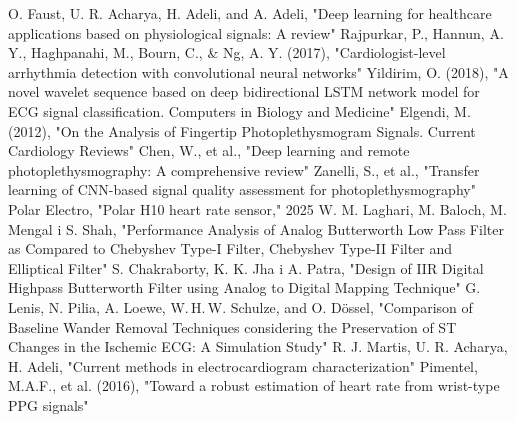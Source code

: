 \documentclass[journal]{IEEEtran}
\begin{document}
 
\newpage
\begin{thebibliography}{1}
 O. Faust, U. R. Acharya, H. Adeli, and A. Adeli, "Deep learning for healthcare applications based on physiological signals: A review"
 Rajpurkar, P., Hannun, A. Y., Haghpanahi, M., Bourn, C., \& Ng, A. Y. (2017), "Cardiologist-level arrhythmia detection with convolutional neural networks"
 Yildirim, O. (2018), "A novel wavelet sequence based on deep bidirectional LSTM network model for ECG signal classification. Computers in Biology and Medicine"
 Elgendi, M. (2012), "On the Analysis of Fingertip Photoplethysmogram Signals. Current Cardiology Reviews"
Chen, W., et al., "Deep learning and remote photoplethysmography: A comprehensive review" 
Zanelli, S., et al., "Transfer learning of CNN-based signal quality assessment for photoplethysmography"
Polar Electro, "Polar H10 heart rate sensor," 2025
W. M. Laghari, M. Baloch, M. Mengal i S. Shah, "Performance Analysis of Analog Butterworth Low Pass Filter as Compared to Chebyshev Type-I Filter, Chebyshev Type-II Filter and Elliptical Filter"
S. Chakraborty, K. K. Jha i A. Patra, "Design of IIR Digital Highpass Butterworth Filter using Analog to Digital Mapping Technique"
G. Lenis, N. Pilia, A. Loewe, W. H. W. Schulze, and O. Dössel, "Comparison of Baseline Wander Removal Techniques considering the Preservation of ST Changes in the Ischemic ECG: A Simulation Study"
R. J. Martis, U. R. Acharya, H. Adeli, "Current methods in electrocardiogram characterization"
Pimentel, M.A.F., et al. (2016), "Toward a robust estimation of heart rate from wrist-type PPG signals"

\end{thebibliography}
\end{document}
